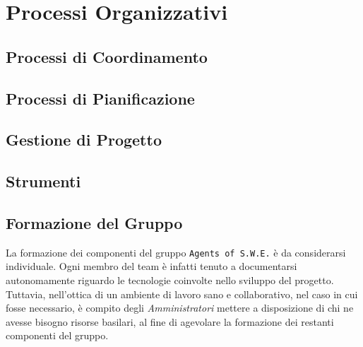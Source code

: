 \section{Processi Organizzativi}\label{ProcessiOrganizzativi}

\subsection{Processi di Coordinamento}\label{ProcessiOrganizzativi_ProcessiCoordinamento}


\subsection{Processi di Pianificazione}



\subsection{Gestione di Progetto}\label{ProcessiOrganizzativi_GestioneProgetto}


\subsection{Strumenti}\label{ProcessiOrganizzativi_Strumenti}


\subsection{Formazione del Gruppo}\label{ProcessiOrganizzativi_FormazioneGruppo}
	La formazione dei componenti del gruppo \texttt{Agents of S.W.E.} è da considerarsi individuale. Ogni membro del team è infatti tenuto a documentarsi autonomamente riguardo le tecnologie coinvolte nello sviluppo del 								progetto\glossario. Tuttavia, nell'ottica di un ambiente di lavoro sano e collaborativo, nel caso in cui fosse necessario, è compito degli \textit{Amministratori} mettere a disposizione di chi ne avesse bisogno risorse basilari, al fine di	agevolare la formazione dei restanti componenti del gruppo.
	

